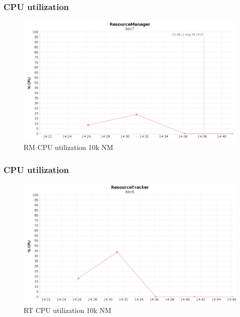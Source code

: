 \documentclass{beamer}
\begin{document}
\begin{frame}
\frametitle{CPU utilization}

\begin{figure}
\centering

\includegraphics[scale=0.3]{resources/RM_CPU_ALL_CPU.png}
\caption{RM CPU utilization 10k NM}
\end{figure}
\end{frame}

\begin{frame}
\frametitle{CPU utilization}

\begin{figure}
\centering
\includegraphics[scale=0.3]{resources/RT_CPU_ALL_CPU.png}
\caption{RT CPU utilization 10k NM}
\end{figure}
\end{frame}
\end{document}
